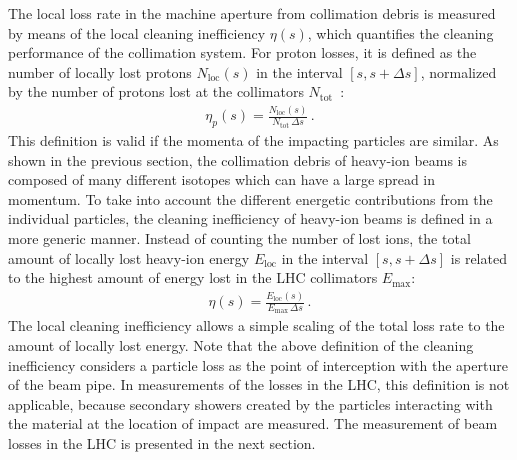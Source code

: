 The local loss rate in the machine aperture from collimation debris is measured by means of the local cleaning inefficiency $\eta(s)$, which quantifies the cleaning performance of the collimation system. For proton losses, it is defined as the number of locally lost protons $N_\text{loc}(s)$ in the interval $[s,s+\Delta s]$, normalized by the number of protons lost at the collimators $N_\text{tot}$~\cite{Bruce2014a}:
%
\begin{align}
  \eta_p(s) = \frac{N_\text{loc}(s)}{N_\text{tot} \, \Delta s} \, . \label{eq:eta:prot}
\end{align}
%
This definition is valid if the momenta of the impacting particles are similar. As shown in the previous section, the collimation debris of heavy-ion beams is composed of many different isotopes which can have a large spread in momentum. To take into account the different energetic contributions from the individual particles, the cleaning inefficiency of heavy-ion beams is defined in a more generic manner. Instead of counting the number of lost ions, the total amount of locally lost heavy-ion energy $E_\text{loc}$ in the interval $[s,s+\Delta s]$ is related to the  highest amount of energy lost in the LHC collimators $E_\text{max}$:
%
\begin{align}
  \eta(s) = \frac{ E_\text{loc} (s)  }{E_\text{max} \, \Delta s} \, . \label{eq:eta:ions}
\end{align}
%
%
The local cleaning inefficiency allows a simple scaling of the total loss rate to the amount of locally lost energy. Note that the above definition of the cleaning inefficiency considers a particle loss as the point of interception with the aperture of the beam pipe. In measurements of the losses in the LHC, this definition is not applicable, because secondary showers created by the particles interacting with the material at the location of impact are measured. The measurement of beam losses in the LHC is presented in the next section.



